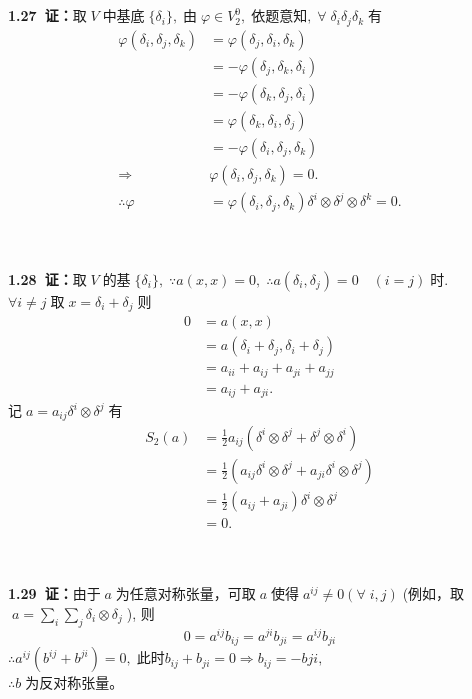 \noindent
\\
\\
{\textbf{1.27\ 证：}}取$\;V\;$中基底$\;\{\delta_i\},\;$由$\;\varphi\in V_2^0,\;$依题意知$,\;\forall\;\delta_i\delta_j\delta_k\;$有
\begin{align*}
\varphi(\delta_i,\delta_j,\delta_k)&=\varphi(\delta_j,\delta_i,\delta_k)
                                   \\
                                   &=-\varphi(\delta_j,\delta_k,\delta_i)
                                   \\
                                   &=-\varphi(\delta_k,\delta_j,\delta_i)
                                   \\
                                   &=\varphi(\delta_k,\delta_i,\delta_j)
                                   \\
                                   &=-\varphi(\delta_i,\delta_j,\delta_k)
         \\
         \Rightarrow &\varphi(\delta_i,\delta_j,\delta_k)=0.
         \\
         \therefore \varphi&=\varphi(\delta_i,\delta_j,\delta_k)\delta^i\otimes\delta^j\otimes\delta^k=0.
\end{align*}


\noindent
\\
\\
{\textbf{1.28\ 证：}}取$\;V\;$的基$\;\{\delta_i\},\;\because a(x,x)=0,\;\therefore a(\delta_i,\delta_j)=0\quad (i=j)\;$时.
\\
$\forall i\neq j\;$取$\;x=\delta_i+\delta_j\;$则
\begin{align*}
    0 &=a(x,x)
      \\
      &=a(\delta_i+\delta_j,\delta_i+\delta_j)
      \\
      &=a_{ii}+a_{ij}+a_{ji}+a_{jj}
      \\
      &=a_{ij}+a_{ji}.
\end{align*}
记$\;a=a_{ij}\delta^i\otimes \delta^j\;$有
\begin{align*}
S_2(a)&=\frac{1}{2}a_{ij}(\delta^i\otimes\delta^j+\delta^j\otimes\delta^i)
    \\
    &=\frac{1}{2}(a_{ij}\delta^i\otimes\delta^j+a_{ji}\delta^i\otimes \delta^j)
    \\
    &=\frac{1}{2}(a_{ij}+a_{ji})\delta^i\otimes\delta^j
    \\
    &=0.
\end{align*}

\noindent
\\
\\
{\textbf{1.29\ 证：}}由于$\;a\;$为任意对称张量，可取$\;a\;$使得$\;a^{ij}\neq 0(\forall\;i,j)\;$(\;例如，取$\;a=\sum_{i}\sum_{j}\delta_i\otimes\delta_j\;$), 则
$$0=a^{ij}b_{ij}=a^{ji}b_{ji}=a^{ij}b_{ji}$$
$\therefore a^{ij}(b^{ij}+b^{ji})=0,\;$此时$b_{ij}+b_{ji}=0\Rightarrow b_{ij}=-b{ji},$
\\
$\therefore b\;$为反对称张量。

